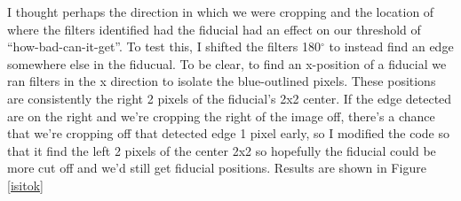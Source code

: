 \documentclass[10pt]{article}
\begin{document}
I thought perhaps the direction in which we were cropping and the location of where the filters identified had the fiducial had an effect on our threshold of ``how-bad-can-it-get''. To test this, I shifted the filters 180$^\circ$ to instead find an edge somewhere else in the fiducual. To be clear, to find an x-position of a fiducial we ran filters in the x direction to isolate the blue-outlined pixels. These positions are consistently the right 2 pixels of the fiducial's 2x2 center. If the edge detected are on the right and we're cropping the right of the image off, there's a chance that we're cropping off that detected edge 1 pixel early, so I modified the code so that it find the left 2 pixels of the center 2x2 so hopefully the fiducial could be more cut off and we'd still get fiducial positions. Results are shown in Figure \ref{isitok}
\end{document}
